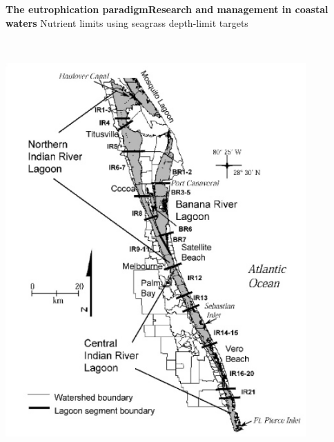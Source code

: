 \documentclass[serif]{beamer}\usepackage[]{graphicx}\usepackage[]{color}
\begin{document}
\begin{frame}{\textbf{The eutrophication paradigm}}{\textbf{Research and management in coastal waters}}
\onslide<+->
Nutrient limits using seagrass depth-limit targets \tiny \cite{Steward07}\\~\\
\begin{columns}[T]
\begin{column}{0.45\textwidth}
\centerline{\includegraphics[width = 0.9\textwidth]{fig/irl_map.png}}
\end{column}
\begin{column}{0.45\textwidth}

\end{column}
\end{columns}
\end{frame}
\end{document}
